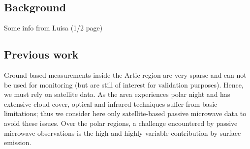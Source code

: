 \documentclass[12pt,oneside,a4paper]{article}
\begin{document}


\subsection{Background}
%
\label{sec:background}
Some info from Luisa (1/2 page)

\subsection{Previous work}
%
\label{sec:previousworks}
%
Ground-based measurements inside the Artic region are very sparse and can not
be used for monitoring (but are still of interest for validation purposes).
Hence, we must rely on satellite data. As the area experiences polar night and has extensive cloud cover, optical and infrared techniques suffer from basic limitations; thus we consider here only satellite-based passive microwave data to avoid these issues. Over the polar regions, a challenge encountered by passive microwave observations is the high and highly variable contribution by surface emission.
\end{document}
